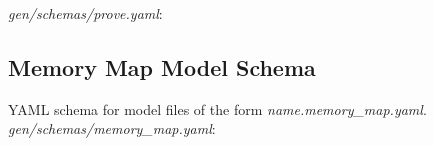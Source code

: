 \begin{appendices}
\textit{gen/schemas/prove.yaml}:

\subsection{Memory Map Model Schema}
YAML schema for model files of the form \textit{name.memory\_map.yaml}. \\

\textit{gen/schemas/memory\_map.yaml}:

\end{appendices}


